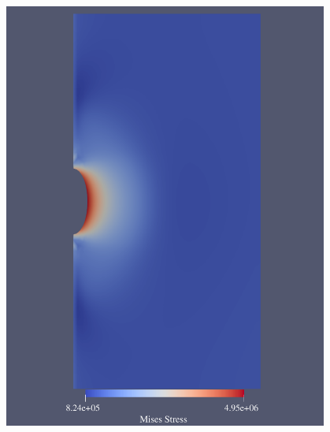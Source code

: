 \begin{figure}[ht!]
{\begin{minipage}{7cm}
            \includegraphics[width=0.95\textwidth]{img/chap5/应力/gk2mises.pdf}
        \end{minipage}
    }
\end{figure}
